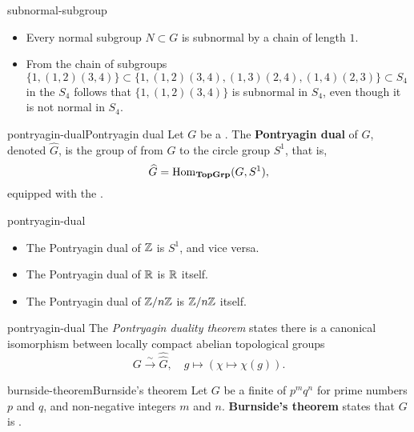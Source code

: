 \begin{example}{subnormal-subgroup}
    \begin{itemize}
        \item Every normal subgroup $N \subset G$ is subnormal by a chain of length $1$.
        \item From the chain of subgroups $\{ 1, (1, 2) (3, 4) \} \subset \{ 1, (1, 2) (3, 4), (1, 3) (2, 4), (1, 4) (2, 3) \} \subset S_4$ in the  $S_4$ follows that $\{ 1, (1, 2)(3, 4) \}$ is subnormal in $S_4$, even though it is not normal in $S_4$.
    \end{itemize}
\end{example}

\begin{topic}{pontryagin-dual}{Pontryagin dual}
    Let $G$ be a   . The \textbf{Pontryagin dual} of $G$, denoted $\widehat{G}$, is the group of   from $G$ to the circle group $S^1$, that is,
    \[ \widehat{G} = \operatorname{Hom}_\textbf{TopGrp}(G, S^1) , \]
    equipped with the .
\end{topic}

\begin{example}{pontryagin-dual}
    \begin{itemize}
        \item The Pontryagin dual of $\mathbb{Z}$ is $S^1$, and vice versa.
        \item The Pontryagin dual of $\mathbb{R}$ is $\mathbb{R}$ itself.
        \item The Pontryagin dual of $\mathbb{Z}/n\mathbb{Z}$ is $\mathbb{Z}/n\mathbb{Z}$ itself.
    \end{itemize}
\end{example}

\begin{example}{pontryagin-dual}
    The \textit{Pontryagin duality theorem} states there is a canonical isomorphism between locally compact abelian topological groups
    \[ G \xrightarrow{\sim} \widehat{\widehat{G}}, \quad g \mapsto (\chi \mapsto \chi(g)) . \]
\end{example}

\begin{topic}{burnside-theorem}{Burnside's theorem}
    Let $G$ be a finite  of  $p^m q^n$ for prime numbers $p$ and $q$, and non-negative integers $m$ and $n$. \textbf{Burnside's theorem} states that $G$ is .
\end{topic}

